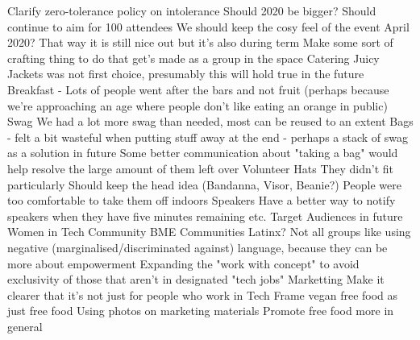 \documentclass[11pt]{meetingmins}
\begin{document}
\begin{items}
		\subitem Clarify zero-tolerance policy on intolerance
		\subitem Should 2020 be bigger?
			\subsubitem Should continue to aim for 100 attendees
			\subsubitem We should keep the cosy feel of the event
		\subitem April 2020? That way it is still nice out but it's also during term
		\subitem Make some sort of crafting thing to do that get's made as a group in the space
		\subitem Catering
			\subsubitem Juicy Jackets was not first choice, presumably this will hold true in the future
			\subsubitem Breakfast - Lots of people went after the bars and not fruit (perhaps because we're approaching an age where people don't like eating an orange in public)
		\subitem Swag
			\subsubitem We had a lot more swag than needed, most can be reused to an extent
			\subsubitem Bags - felt a bit wasteful when putting stuff away at the end - perhaps a stack of swag as a solution in future
			\subsubitem Some better communication about "taking a bag" would help resolve the large amount of them left over
		\subitem Volunteer Hats
			\subsubitem They didn't fit particularly 
			\subsubitem Should keep the head idea (Bandanna, Visor, Beanie?)
			\subsubitem People were too comfortable to take them off indoors
		\subitem Speakers
			\subsubitem Have a better way to notify speakers when they have five minutes remaining etc.
		\subitem Target Audiences in future
			\subsubitem Women in Tech Community
			\subsubitem BME Communities
			\subsubitem Latinx?
			\subsubitem Not all groups like using negative (marginalised/discriminated against) language, because they can be more about empowerment
			\subsubitem Expanding the "work with concept" to avoid exclusivity of those that aren't in designated "tech jobs"
		\subitem Marketting
			\subsubitem Make it clearer that it's not just for people who work in Tech
			\subsubitem Frame vegan free food as just free food
			\subsubitem Using photos on marketing materials
			\subsubitem Promote free food more in general
\end{items}
\end{document}
